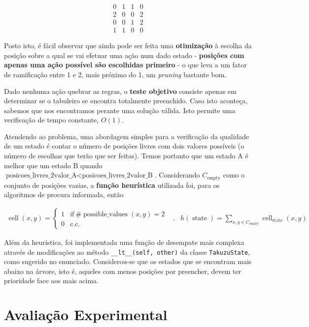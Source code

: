 \documentclass[12pt,a4paper]{article}
\newcommand{\op}{\operatorname}
\begin{document}
\[
  \begin{array}{cccc}
    0 & 1 & 1 & 0 \\
    2 & 0 & 0 & 2 \\
    0 & 0 & 1 & 2 \\
    1 & 1 & 0 & 0
  \end{array}
\]

Posto isto, é fácil observar que ainda pode ser feita uma \textbf{otimização} à escolha da
posição sobre a qual se vai efetuar uma ação num dado estado -
\textbf{posições com apenas uma ação possível são escolhidas primeiro} -
o que leva a um fator de ramificação entre 1 e 2,
mais próximo do 1, um \textit{pruning} bastante bom.

Dado nenhuma ação quebrar as regras, o \textbf{teste objetivo} consiste apenas em determinar
se o tabuleiro se encontra totalmente preenchido. Caso isto aconteça, sabemos que
nos encontramos perante uma solução válida. Isto permite uma verificação de tempo constante, \(O(1)\).

Atendendo ao problema, uma abordagem simples para a verificação da qualidade de
um estado é contar o número de posições livres com dois valores possíveis
(o número de escolhas que terão que ser feitas).
Temos portanto que um estado A é melhor que um estado B quando
\(\text{posicoes\_livres\_2valor\_A} < \text{posicoes\_livres\_2valor\_B}\).
Considerando \(C_{\op{empty}}\) como o conjunto de posições vazias, a
\textbf{função heurística} utilizada foi, para os algoritmos de procura informada, então

\[
  \begin{aligned}
    \op{cell}(x, y) = \begin{cases}
                        1 & \text{if}~\#\op{possible\_values}(x, y) = 2 \\
                        0 & \text{c.c.}
                      \end{cases}
     & , &
    h(\op{state}) = \sum_{x,y\in C_{\op{empty}}} \op{cell}_{\op{state}}(x, y)
  \end{aligned}
\]

Além da heurística, foi implementada uma função de desempate mais complexa através de
modificações ao método \texttt{\_\_lt\_\_(self, other)} da classe \texttt{TakuzuState}, como sugerido no enunciado.
Considerou-se que os estados que se encontram mais abaixo na árvore, isto é, aqueles com
menos posições por preencher, devem ter prioridade face aos mais acima.

\section{Avaliação Experimental}
\end{document}
